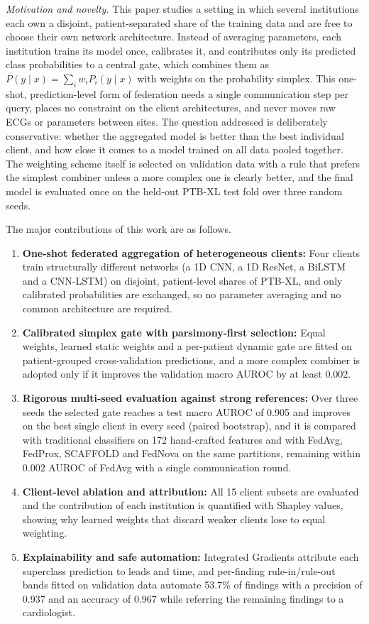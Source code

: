 \textit{Motivation and novelty.} This paper studies a setting in which several institutions each
own a disjoint, patient-separated share of the training data and are free to choose their own
network architecture. Instead of averaging parameters, each institution trains its model once,
calibrates it, and contributes only its predicted class probabilities to a central gate, which
combines them as $P(y\mid x)=\sum_i w_i P_i(y\mid x)$ with weights on the probability simplex. This
one-shot, prediction-level form of federation needs a single communication step per query, places
no constraint on the client architectures, and never moves raw ECGs or parameters between sites. The
question addressed is deliberately conservative: whether the aggregated model is better than the
best individual client, and how close it comes to a model trained on all data pooled together. The
weighting scheme itself is selected on validation data with a rule that prefers the simplest
combiner unless a more complex one is clearly better, and the final model is evaluated once on the
held-out PTB-XL test fold over three random seeds.

The major contributions of this work are as follows.
\begin{enumerate}
  \item \textbf{One-shot federated aggregation of heterogeneous clients:} Four clients train
  structurally different networks (a 1D CNN, a 1D ResNet, a BiLSTM and a CNN-LSTM) on disjoint,
  patient-level shares of PTB-XL, and only calibrated probabilities are exchanged, so no parameter
  averaging and no common architecture are required.
  \item \textbf{Calibrated simplex gate with parsimony-first selection:} Equal weights, learned
  static weights and a per-patient dynamic gate are fitted on patient-grouped cross-validation
  predictions, and a more complex combiner is adopted only if it improves the validation macro AUROC
  by at least 0.002.
  \item \textbf{Rigorous multi-seed evaluation against strong references:} Over three seeds the
  selected gate reaches a test macro AUROC of 0.905 and improves on the best single client in every
  seed (paired bootstrap), and it is compared with traditional classifiers on 172 hand-crafted
  features and with FedAvg, FedProx, SCAFFOLD and FedNova on the same partitions, remaining within
  0.002 AUROC of FedAvg with a single communication round.
  \item \textbf{Client-level ablation and attribution:} All 15 client subsets are evaluated and
  the contribution of each institution is quantified with Shapley values, showing why learned
  weights that discard weaker clients lose to equal weighting.
  \item \textbf{Explainability and safe automation:} Integrated Gradients attribute each superclass
  prediction to leads and time, and per-finding rule-in/rule-out bands fitted on validation data
  automate 53.7\% of findings with a precision of 0.937 and an accuracy of 0.967 while referring the
  remaining findings to a cardiologist.
\end{enumerate}


